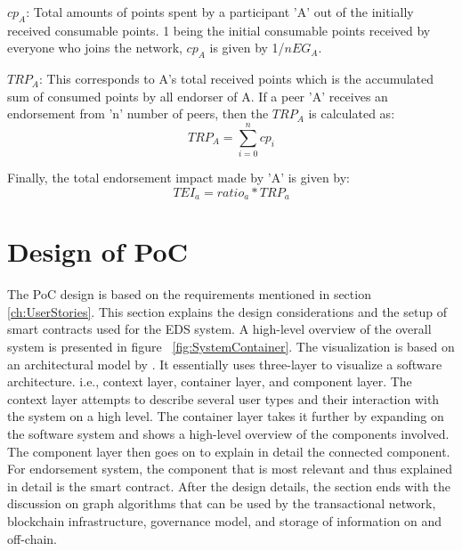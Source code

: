 \textit{$cp_A$}: Total amounts of points spent by a participant 'A' out of the
initially received consumable points. 1 being the initial consumable points
received by everyone who joins the network, \textit{$cp_A$} is given by
1/\textit{$nEG_A$}.

\textit{$TRP_A$}: This corresponds to A's total received points which is the
accumulated sum of consumed points by all endorser of A.  If a peer 'A'
receives an endorsement from 'n' number of peers, then the \textit{$TRP_A$} is
calculated as:
\begin{equation}
	TRP_A  = \sum_{i=0}^{n}cp_{i}
\end{equation}

Finally, the total endorsement impact made by 'A' is given by: \\
\begin{equation}
	TEI_a = ratio_a * TRP_a
\end{equation}

%

\section{Design of PoC}\label{sec:pocDesign}
The PoC design is based on the requirements mentioned in section
\ref{ch:UserStories}. This section explains the design considerations and the
setup of smart contracts used for the EDS system. A high-level overview of the
overall system is presented in figure ~\ref{fig:SystemContainer}. The
visualization is based on an architectural model by \cite{brown2013software}.
It essentially uses three-layer to visualize a software architecture. i.e.,
context layer, container layer, and component layer. The context layer attempts
to describe several user types and their interaction with the system on a high
level. The container layer takes it further by expanding on the software system
and shows a high-level overview of the components involved. The component layer
then goes on to explain in detail the connected component. For endorsement
system, the component that is most relevant and thus explained in detail is the
smart contract.
After the design details, the section ends with the discussion on graph
algorithms that can be used by the transactional network, blockchain
infrastructure, governance model, and storage of information on and off-chain.

